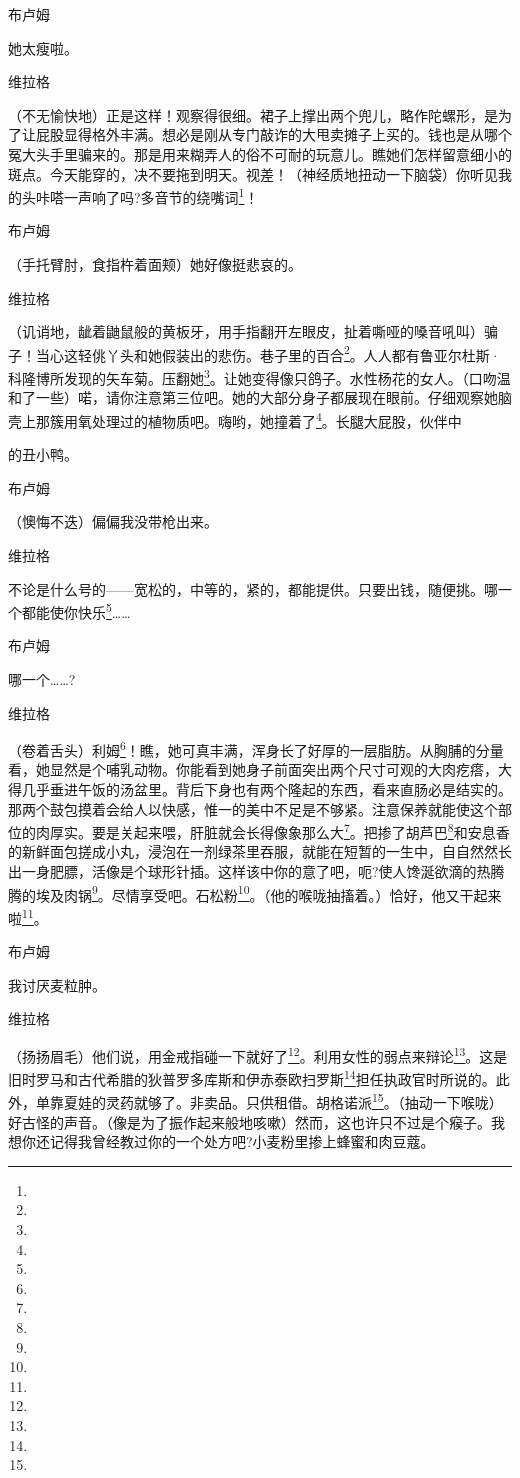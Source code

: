 \par 布卢姆
\par 她太瘦啦。
\par 维拉格
\par （不无愉快地）正是这样！观察得很细。裙子上撑出两个兜儿，略作陀螺形，是为了让屁股显得格外丰满。想必是刚从专门敲诈的大甩卖摊子上买的。钱也是从哪个冤大头手里骗来的。那是用来糊弄人的俗不可耐的玩意儿。瞧她们怎样留意细小的斑点。今天能穿的，决不要拖到明天。视差！（神经质地扭动一下脑袋）你听见我的头咔嗒一声响了吗?多音节的绕嘴词\footnote{}！
\par 布卢姆
\par （手托臂肘，食指杵着面颊）她好像挺悲哀的。
\par 维拉格
\par （讥诮地，龇着鼬鼠般的黄板牙，用手指翻开左眼皮，扯着嘶哑的嗓音吼叫）骗子！当心这轻佻丫头和她假装出的悲伤。巷子里的百合\footnote{}。人人都有鲁亚尔杜斯·科隆博所发现的矢车菊。压翻她\footnote{}。让她变得像只鸽子。水性杨花的女人。（口吻温和了一些）喏，请你注意第三位吧。她的大部分身子都展现在眼前。仔细观察她脑壳上那簇用氧处理过的植物质吧。嗨哟，她撞着了\footnote{}。长腿大屁股，伙伴中
\par 的丑小鸭。
\par 布卢姆
\par （懊悔不迭）偏偏我没带枪出来。
\par 维拉格
\par 不论是什么号的——宽松的，中等的，紧的，都能提供。只要出钱，随便挑。哪一个都能使你快乐\footnote{}……
\par 布卢姆
\par 哪一个……?
\par 维拉格
\par （卷着舌头）利姆\footnote{}！瞧，她可真丰满，浑身长了好厚的一层脂肪。从胸脯的分量看，她显然是个哺乳动物。你能看到她身子前面突出两个尺寸可观的大肉疙瘩，大得几乎垂进午饭的汤盆里。背后下身也有两个隆起的东西，看来直肠必是结实的。那两个鼓包摸着会给人以快感，惟一的美中不足是不够紧。注意保养就能使这个部位的肉厚实。要是关起来喂，肝脏就会长得像象那么大\footnote{}。把掺了胡芦巴\footnote{}和安息香的新鲜面包搓成小丸，浸泡在一剂绿茶里吞服，就能在短暂的一生中，自自然然长出一身肥膘，活像是个球形针插。这样该中你的意了吧，呃?使人馋涎欲滴的热腾腾的埃及肉锅\footnote{}。尽情享受吧。石松粉\footnote{}。（他的喉咙抽搐着。）恰好，他又干起来啦\footnote{}。
\par 布卢姆
\par 我讨厌麦粒肿。
\par 维拉格
\par （扬扬眉毛）他们说，用金戒指碰一下就好了\footnote{}。利用女性的弱点来辩论\footnote{}。这是旧时罗马和古代希腊的狄普罗多库斯和伊赤泰欧扫罗斯\footnote{}担任执政官时所说的。此外，单靠夏娃的灵药就够了。非卖品。只供租借。胡格诺派\footnote{}。（抽动一下喉咙）好古怪的声音。（像是为了振作起来般地咳嗽）然而，这也许只不过是个瘊子。我想你还记得我曾经教过你的一个处方吧?小麦粉里掺上蜂蜜和肉豆蔻。
